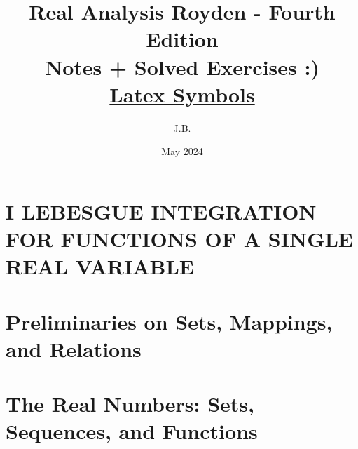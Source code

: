 \documentclass[a4paper,10pt]{book}
\title{Real Analysis Royden - Fourth Edition\\
	\large Notes + Solved Exercises :) \\
	\large \href{https://latex-programming.fandom.com/wiki/List_of_LaTeX_symbols}{Latex Symbols}
}
\author{J.B.}
\date{\small May 2024}
\theoremstyle{plain} %
\begin{document}
\maketitle
\tableofcontents

\setcounter{chapter}{0}
\chapter*{I LEBESGUE INTEGRATION FOR FUNCTIONS OF A SINGLE REAL VARIABLE}
\setcounter{chapter}{0}

\setcounter{chapter}{0}
\chapter*{Preliminaries on Sets, Mappings, and Relations}
\setcounter{chapter}{0}



\chapter{The Real Numbers: Sets, Sequences, and Functions}
\minitoc
\end{document}
